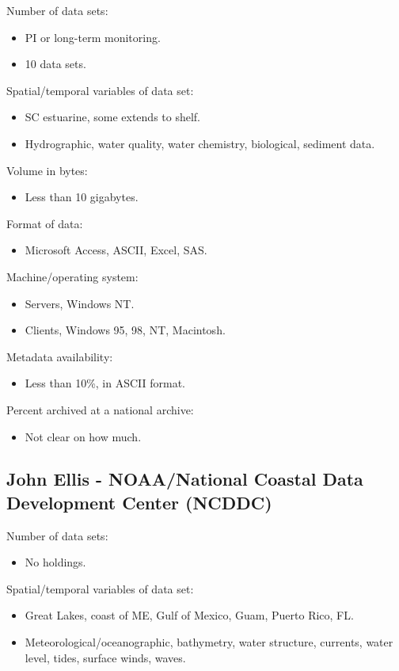 Number of data sets:
\begin{itemize}
  \item PI or long-term monitoring.
  \item 10 data sets.
\end{itemize}

Spatial/temporal variables of data set:
\begin{itemize}
  \item SC estuarine, some extends to shelf.
  \item Hydrographic, water quality, water chemistry, biological, sediment data.
\end{itemize}

Volume in bytes:
\begin{itemize}
  \item Less than 10 gigabytes.
\end{itemize}

Format of data:
\begin{itemize}
  \item Microsoft Access, ASCII, Excel, SAS.
\end{itemize}

Machine/operating system:
\begin{itemize}
  \item Servers, Windows NT.
  \item Clients, Windows 95, 98, NT, Macintosh.
\end{itemize}

Metadata availability:
\begin{itemize}
  \item Less than 10\%, in ASCII format.
\end{itemize}

Percent archived at a national archive:
\begin{itemize}
  \item Not clear on how much.
\end{itemize}

\subsection{John Ellis - NOAA/National Coastal Data Development Center (NCDDC)}

Number of data sets:
\begin{itemize}
  \item No holdings.
\end{itemize}

Spatial/temporal variables of data set:
\begin{itemize}
  \item Great Lakes, coast of ME, Gulf of Mexico, Guam, Puerto Rico, FL.
  \item Meteorological/oceanographic, bathymetry, water structure,
currents, water level, tides, surface winds, waves.
\end{itemize}

